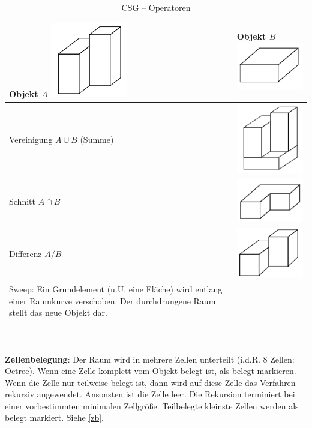 \begin{table}[hbt]
\centering
\begin{tabular}{|p{6.5cm}|p{6.5cm}|}
\hline
Objekt $A$ \includegraphics[width=.1\textwidth]{figures/ch02_a.png} & Objekt $B$ \includegraphics[width=.1\textwidth]{figures/ch02_b.png}\\
\hline
Vereinigung $A \cup B$ (Summe) & \includegraphics[width=.1\textwidth]{figures/ch02_ab.png}\\
\hline
Schnitt $A \cap B$ & \includegraphics[width=.1\textwidth]{figures/ch02_ab1.png} \\
\hline
Differenz $A / B$ & \includegraphics[width=.1\textwidth]{figures/ch02_ab2.png}\\
\hline
Sweep:
Ein Grundelement (u.U. eine Fläche) wird entlang einer Raumkurve
verschoben. Der durchdrungene Raum stellt das neue Objekt dar. & \\
\hline
\end{tabular}
\caption{CSG -- Operatoren}
\label{tab:csg_ops}
\end{table}\\ \\
\textbf{Zellenbelegung}:
Der Raum wird in mehrere Zellen unterteilt (i.d.R. 8 Zellen: \glqq Octree\grqq).
Wenn eine Zelle komplett vom Objekt belegt ist, als \glqq belegt\grqq{} markieren.
Wenn die Zelle nur teilweise belegt ist, dann wird auf diese Zelle das
Verfahren rekursiv angewendet. Ansonsten ist die Zelle leer.
Die Rekursion terminiert bei einer vorbestimmten minimalen Zellgröße.
Teilbelegte kleinste Zellen werden als belegt markiert. Siehe \autoref{zb}.
